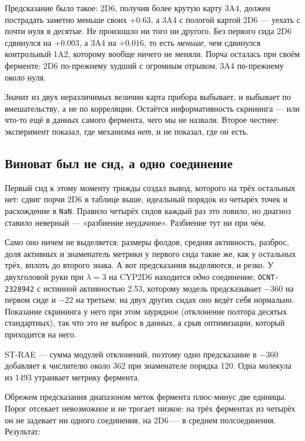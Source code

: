 Предсказание было такое: 2D6, получив более крутую карту 3A4, должен пострадать заметно
меньше своих $+0.63$, а 3A4 с пологой картой 2D6 --- уехать с почти нуля в десятые. Не
произошло ни того ни другого. Без первого сида 2D6 сдвинулся на $+0.003$, а 3A4 на $+0.016$,
то есть \emph{меньше}, чем сдвинулся контрольный 1A2, которому вообще ничего не меняли.
Порча осталась при своём ферменте: 2D6 по-прежнему худший с огромным отрывом, 3A4
по-прежнему около нуля.

Значит из двух неразличимых величин карта прибора выбывает, и выбывает по вмешательству, а
не по корреляции. Остаётся информативность скрининга --- или что-то ещё в данных самого
фермента, чего мы не назвали. Второе честнее: эксперимент показал, где механизма \emph{нет},
и не показал, где он есть.

\subsection{Виноват был не сид, а одно соединение}

Первый сид к этому моменту трижды создал вывод, которого на трёх остальных нет: сдвиг порчи
2D6 в таблице выше, идеальный порядок из четырёх точек и расхождение в \texttt{NaN}. Правило
четырёх сидов каждый раз это ловило, но диагноз ставило неверный --- «разбиение неудачное».
Разбиение тут ни при чём.

Само оно ничем не выделяется: размеры фолдов, средняя активность, разброс, доля активных и
знаменатель метрики у первого сида такие же, как у остальных трёх, вплоть до второго знака.
А вот предсказания выделяются, и резко. У двухголовой руки при $\lambda = 3$ на CYP2D6
находится \emph{одно} соединение, \texttt{OCNT-2328942} с истинной активностью 2.53, которому
модель предсказывает $-360$ на первом сиде и $-22$ на третьем; на двух других сидах оно ведёт
себя нормально. Показание скрининга у него при этом заурядное (отклонение полтора десятых
стандартных), так что это не выброс в данных, а срыв оптимизации, который приходится на него.

ST-RAE --- сумма модулей отклонений, поэтому одно предсказание в $-360$ добавляет к числителю
около 362 при знаменателе порядка 120. Одна молекула из 1493 утраивает метрику фермента.

Обрежем предсказания диапазоном меток фермента плюс-минус две единицы. Порог отсекает
невозможное и не трогает низкое: на трёх ферментах из четырёх он не задевает ни одного
соединения, на 2D6 --- в среднем полсоединения. Результат:

